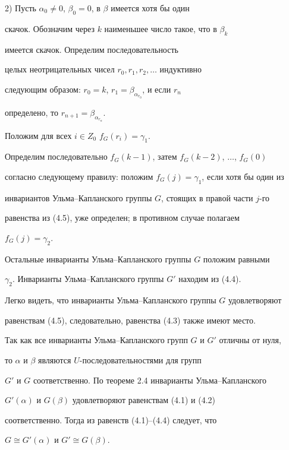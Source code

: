 \begin{pf}
2) Пусть $\alpha_0\neq 0$, $\beta_0=0$, в $\beta$ имеется хотя бы один


скачок. Обозначим через $k$ наименьшее число такое, что в $\beta_k$


имеется скачок. Определим последовательность


целых неотрицательных чисел $r_0, r_1, r_2, \dotsc$ индуктивно


следующим образом: $r_0=k$, $r_1=\beta_{\alpha_{r_0}}$, и если $r_n$


определено, то $r_{n+1}=\beta_{\alpha_{r_n}}$.





Положим для всех $i\in Z_0$\; $f_G(r_i)=\gamma_1$.


Определим последовательно $f_G(k{-}1)$, затем $f_G(k{-}2)$, $\dotsc$, $f_G(0)$




согласно следующему правилу: положим $f_G(j)=\gamma_1$, если хотя бы один из


инвариантов Ульма--Капланского группы $G$, стоящих в правой части $j$-го


равенства из (4.5), уже определен; в противном случае полагаем


$f_G(j)=\gamma_2$.


Остальные инварианты Ульма--Капланского группы $G$ положим равными


$\gamma_2$. Инварианты Ульма--Капланского группы $G'$ находим из (4.4).


Легко видеть, что инварианты Ульма--Капланского группы $G$ удовлетворяют


равенствам (4.5), следовательно, равенства (4.3) также имеют место.





Так как все инварианты Ульма--Капланского групп $G$ и $G'$ отличны от нуля,


то $\alpha$ и $\beta$ являются $U$-последовательностями для групп


$G'$ и $G$ соответственно. По теореме 2.4 инварианты Ульма--Капланского


$G'(\alpha)$ и $G(\beta)$ удовлетворяют равенствам (4.1) и (4.2)


соответственно. Тогда из равенств (4.1)--(4.4) следует, что


$G\cong G'(\alpha)$ и $G'\cong G(\beta)$.






\end{pf}
